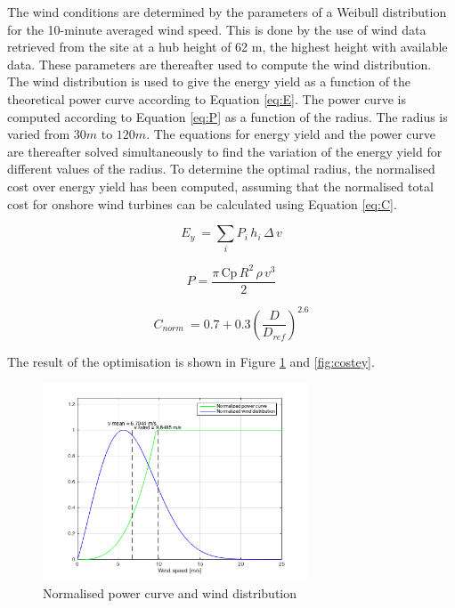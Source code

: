The wind conditions are determined by the parameters of a Weibull distribution for the 10-minute averaged wind speed. This is done by the use of wind data retrieved from the site at a hub height of 62 m, the highest height with available data. These parameters are thereafter used to compute the wind distribution. The wind distribution is used to give the energy yield as a function of the theoretical power curve according to Equation \ref{eq:E}. The power curve is computed according to Equation \ref{eq:P} as a function of the radius. The radius is varied from $30 m$ to $120 m$. The equations for energy yield and the power curve are thereafter solved simultaneously to find the variation of the energy yield for different values of the radius. To determine the optimal radius, the normalised cost over energy yield has been computed, assuming that the normalised total cost for onshore wind turbines can be calculated using Equation \ref{eq:C}.


\begin{equation}
E_{y}\ = \sum_{i} P_{i}\, h_{i}\, \Delta \, v
\label{eq:E}
\end{equation}

\begin{equation}
P = \frac{\pi\, \mathrm{Cp}\, R^2\, \rho\, v^3}{2}
\label{eq:P}
\end{equation}

\begin{equation}
C_{norm}\ = 0.7 + 0.3 {\left(\frac{D}{D_{ref}}\right)}^{2.6}
\label{eq:C}
\end{equation}


\vspace{3mm}

The result of the optimisation is shown in Figure \ref{fig:pcurve} and \ref{fig:costey}.

\begin{figure}[H]
\centering
\includegraphics[width=0.7\textwidth]{Images/p_curve.png} 
\caption{Normalised power curve and wind distribution}\label{fig:pcurve}
\end{figure}

